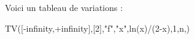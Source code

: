 \documentclass{article}
\begin{document}
\initablor
Voici un tableau de variations :

\begin{TV}
TV([-infinity,+infinity],[2],"f","x",ln(x)/(2-x),1,n,\tv)
\end{TV}

\nettoyer
\end{document}
